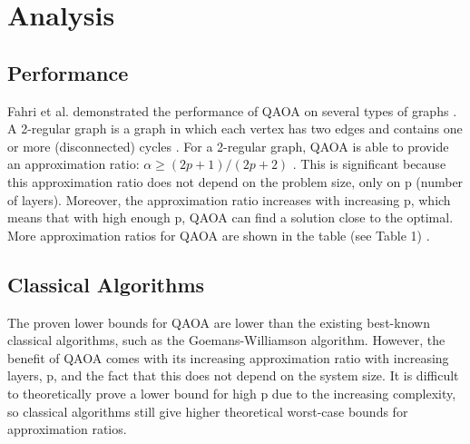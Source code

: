 \section{Analysis}
\subsection{Performance}
Fahri et al. demonstrated the performance of QAOA on several types of graphs \cite{farhiQAOA}. A 2-regular graph is a graph in which each vertex has two edges and contains one or more (disconnected) cycles \cite{farhiQAOA}. For a 2-regular graph, QAOA is able to provide an approximation ratio: $\alpha \geq (2p + 1)/(2p + 2)$ \cite{farhiQAOA}. This is significant because this approximation ratio does not depend on the problem size, only on p (number of layers). Moreover, the approximation ratio increases with increasing p, which means that with high enough p, QAOA can find a solution close to the optimal. More approximation ratios for QAOA are shown in the table (see Table 1) \cite{farhiQAOA, 2018Wurtz_2021, 19HALPERIN2004169}. 

\begin{table}[H]
\centering
{}
\caption{Approximation ratios for QAOA and classical algorithms for different graph types. From \cite{farhiQAOA, 2018Wurtz_2021, 19HALPERIN2004169}}
\label{table:1}
\end{table}

\subsection{Classical Algorithms}
The proven lower bounds for QAOA are lower than the existing best-known classical algorithms, such as the Goemans-Williamson algorithm. However, the benefit of QAOA comes with its increasing approximation ratio with increasing layers, p, and the fact that this does not depend on the system size. It is difficult to theoretically prove a lower bound for high p due to the increasing complexity, so classical algorithms still give higher theoretical worst-case bounds for approximation ratios.

